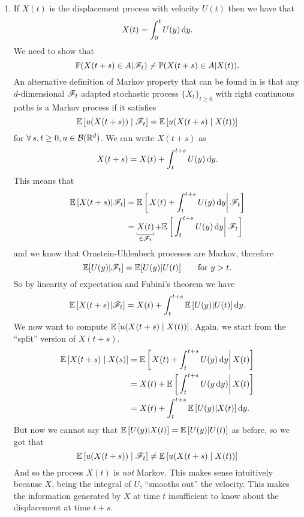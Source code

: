 \documentclass[12pt]{article}
\begin{document}
\begin{enumerate}
\item If $X(t)$ is the displacement process with velocity $U(t)$ then we have that
\begin{equation*}
	X(t)=\int_{0}^{t}U(y)\mathop{}\!\mathrm{d} y.
\end{equation*}
We need to show that 
\begin{equation*}
	\mathbb{P}(X(t+s)\in A|\mathscr{F}_{t})\neq\mathbb{P}(X(t+s)\in A|X(t)).
\end{equation*}
An alternative definition of Markov property that can be found in \cite[64]{rene} is that any $d$-dimensional $\mathscr{F}_{t}$ adapted stochastic process ${\{X_{t}\}}_{t\geq0}$ with right continuous paths is a Markov process if it satisfies
\begin{equation*}
	\mathbb{E}\left[u(X(t+s))\mid\mathscr{F}_{t}\right]=\mathbb{E}\left[u(X(t+s)\mid X(t))\right]
\end{equation*}
for $\forall\, s,t\geq0, u\in\mathcal{B}(\mathbb{R}^{d})$.
We can write $X(t+s)$ as 
\begin{equation*}
	X(t+s)=X(t)+\int_{t}^{t+s}U(y)\mathop{}\!\mathrm{d} y.
\end{equation*}
This means that 
\begin{align*}
	\ev\left[X(t+s)|\F_{t}\right]&=\ev\left[\left.X(t)+\int_{t}^{t+s}U(y)\dy\right|\F_{t}\right]\\
	&=\ubracketthin{X(t)}_{\mathclap{\in  \F_{t}}}+\ev\left[\left.\int_{t}^{t+s}U(y)\dy\right|\F_{t}\right]
\end{align*}
and we know that Ornstein-Uhlenbeck processes are Markov, therefore
\begin{equation*}
	\mathbb{E}[U(y)|\mathscr{F}_{t}]=\mathbb{E}[U(y)|U(t)]\qquad\text{for }y>t.
\end{equation*}
So by linearity of expectation and Fubini's theorem we have
\begin{equation*}
	\mathbb{E}\left[X(t+s)|\mathscr{F}_{t}\right]=X(t)+\int_{t}^{t+s}\mathbb{E}\left[U(y)|U(t)\right]\mathop{}\!\mathrm{d} y.
\end{equation*}
We now want to compute $\mathbb{E}\left[u(X(t+s)\mid X(t))\right]$. Again, we start from the ``split'' version of $X(t+s)$.
\begin{align*}
	\mathbb{E}\left[X(t+s)\mid X(s)\right]&=\mathbb{E}\left[\left.X(t)+\int_{t}^{t+s}U(y)\mathop{}\!\mathrm{d} y\right|X(t)\right]\\
	&=X(t)+\mathbb{E}\left[\left.\int_{t}^{t+s}U(y\mathop{}\!\mathrm{d} y)\right|X(t)\right]\\
	&=X(t)+\int_{t}^{t+s}\mathbb{E}\left[U(y)|X(t)\right]\mathop{}\!\mathrm{d} y.
\end{align*}
But now we cannot say that $\mathbb{E}\left[U(y)|X(t)\right]=\mathbb{E}\left[U(y)|U(t)\right]$ as before, so we got that 
\begin{equation*}
	\mathbb{E}\left[u(X(t+s))\mid\mathscr{F}_{t}\right]\neq\mathbb{E}\left[u(X(t+s)\mid X(t))\right]
\end{equation*}
And so the process $X(t)$ is \textit{not} Markov. This makes sense intuitively because $X$, being the integral of $U$, ``smooths out'' the velocity. This makes the information generated by $X$ at time $t$ insufficient to know about the displacement at time $t+s$.
	\end{enumerate}
	
\end{document}
